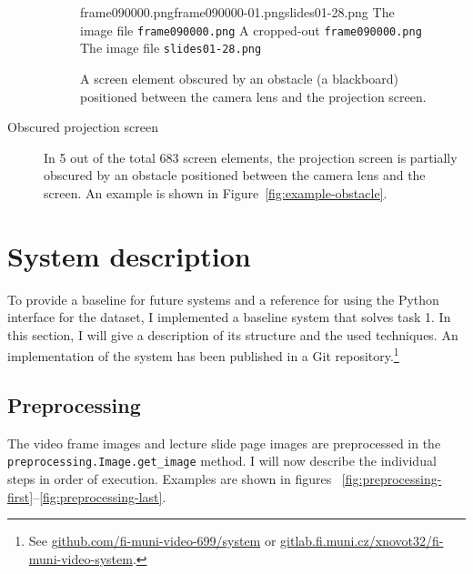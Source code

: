\begin{description}
  \begin{figure}[!t]
    \inputminted{xml}{fig/examples/obstacle/example.xml}\par
      {frame090000.png}{frame090000-01.png}{slides01-28.png}%
      {The image file \texttt{frame090000.png}}%
      {A cropped-out \texttt{frame090000.png}}%
      {The image file \texttt{slides01-28.png}}
    \caption{A screen element obscured by an obstacle (a blackboard) positioned
      between the camera lens and the projection screen.}
    \label{fig:example-obstacle}
    \label{fig:example-last}
  \end{figure}
  \item[Obscured projection screen] In 5 out of the total 683 screen elements,
    the projection screen is partially obscured by an obstacle positioned
    between the camera lens and the screen.
    An example is shown in Figure~\ref{fig:example-obstacle}.
\end{description}

\FloatBarrier
\section{System description}
\label{sec:system-description}
To provide a baseline for future systems and a reference for using the Python
interface for the dataset, I implemented a baseline system that solves task 1.
In this section, I will give a description of its structure and the used
techniques.  An implementation of the system has been published in a Git
repository.\footnote{See
  \href{https://github.com/fi-muni-video-699/system}%
       {github.com/fi-muni-video-699/system} or
  \href{https://gitlab.fi.muni.cz/xnovot32/fi-muni-video-system}%
       {gitlab.fi.muni.cz/xnovot32/fi-muni-video-system}.}

\FloatBarrier
\subsection{Preprocessing}
\label{sec:preprocessing}
The video frame images and lecture slide page images are preprocessed in the
\texttt{preprocessing.Image.get\_image} method. I will now describe the
individual steps in order of execution. Examples are shown in figures~%
\ref{fig:preprocessing-first}--\ref{fig:preprocessing-last}.

